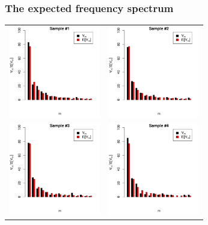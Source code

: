 \documentclass[handout,notes=show,t]{beamer} %
\begin{document}
\begin{frame}
  \frametitle{The expected frequency spectrum}

  \ungap[1]
  \begin{center}
    \begin{tabular}{cc}
      \includegraphics[width=40mm]{img/02-samples-spc-exp-vs-sample-1} &
      \includegraphics[width=40mm]{img/02-samples-spc-exp-vs-sample-2} \\
      \includegraphics[width=40mm]{img/02-samples-spc-exp-vs-sample-3} &
      \includegraphics[width=40mm]{img/02-samples-spc-exp-vs-sample-4} 
    \end{tabular}
  \end{center}
\end{frame}
\end{document}

